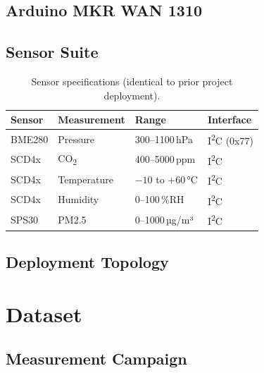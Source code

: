 \subsection{Arduino MKR WAN 1310}

\subsection{Sensor Suite}
\begin{table}[H]
  \centering
  \caption{Sensor specifications (identical to prior project deployment).}
  \label{tab:sensors}
  \begin{tabular}{llll}
    \toprule
    \textbf{Sensor} & \textbf{Measurement} & \textbf{Range} & \textbf{Interface} \\
    \midrule
    BME280  & Pressure    & 300--1100\,hPa       & I\textsuperscript{2}C (0x77) \\
    SCD4x   & CO\textsubscript{2}  & 400--5000\,ppm & I\textsuperscript{2}C \\
    SCD4x   & Temperature & $-10$ to $+60$\,°C   & I\textsuperscript{2}C \\
    SCD4x   & Humidity    & 0--100\,\%RH          & I\textsuperscript{2}C \\
    SPS30   & PM2.5       & 0--1000\,µg/m³        & I\textsuperscript{2}C \\
    \bottomrule
  \end{tabular}
\end{table}

\subsection{Deployment Topology}

\section{Dataset}
\label{sec:dataset}

\subsection{Measurement Campaign}


